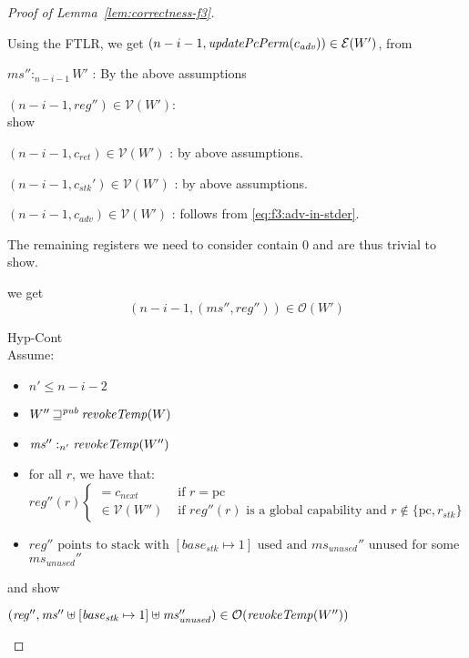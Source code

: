 \documentclass[a4paper]{article}
\newcommand{\var}[1]{\mathit{#1}}
\newcommand{\hs}{\var{ms}}
\newcommand{\ms}{\hs}
\newcommand{\pcreg}{\mathrm{pc}}
\newcommand{\start}{\var{base}}
\newcommand{\reg}{\var{reg}}
\newcommand{\heap}{\var{mem}}
\newcommand{\adv}{\var{adv}}
\newcommand{\stk}{\var{stk}}
\newcommand{\plainfun}[2]{
  \ifthenelse{\equal{#2}{}}
  {\mathit{#1}}
  {\mathit{#1}(#2)}
}
\newcommand{\updatePcPerm}[1]{\plainfun{updatePcPerm}{#1}}
\newcommand{\revokeTemp}[1]{\plainfun{revokeTemp}{#1}}
\newcommand{\futurewk}{\mathbin{\sqsupseteq}^{\var{pub}}}
\newcommand{\heapSat}[3][\heap]{#1 :_{#2} #3}
\newcommand{\memSat}[3][n]{\heapSat[#2]{#1}{#3}}
\newcommand{\asmType}{\plaindom{AsmType}}
\newcommand{\plaindom}[1]{\mathrm{#1}}
\newcommand{\intr}[2]{\mathcal{#1}}
\newcommand{\valueintr}[1]{\intr{V}{#1}}
\newcommand{\exprintr}[1]{\intr{E}{#1}}
\newcommand{\stdvr}{\valueintr{\asmType}}
\newcommand{\stder}{\exprintr{\asmType}}
\newcommand{\observations}{\mathcal{O}}
\newcommand{\npair}[2][n]{\left(#1,#2 \right)}
\begin{document}
\begin{proof}[Proof of Lemma~\ref{lem:correctness-f3}]
\begin{enumproof}
    Using the FTLR, we get $\npair[n-i-1]{\updatePcPerm{c_\adv}} \in \stder(W')$, from
    \begin{enumproof}
      \item $\memSat[n-i-1]{\ms''}{W'}$ : By the above assumptions
      \item $\npair[n-i-1]{\reg''} \in \stdvr(W')$:\\
        show
        \begin{enumproof}
          \item $\npair[n-i-1]{c_{\mathit{ret}}} \in \stdvr(W')$ : by above assumptions.
          \item $\npair[n-i-1]{c_\stk'} \in \stdvr(W')$ : by above assumptions.
          \item $\npair[n-i-1]{c_\adv} \in \stdvr(W')$ : follows from \ref{eq:f3:adv-in-stder}.
          \item The remaining registers we need to consider contain 0 and are thus trivial to show.
        \end{enumproof}
    \end{enumproof}
    we get
    \[
      \npair[n-i-1]{(\ms'',\reg'')} \in \observations(W')
    \]
  \item Hyp-Cont\\
    Assume:
    \begin{itemize}
    \item $n' \leq n-i-2$
    \item $W'' \futurewk \revokeTemp{W}$
    \item $\memSat[n']{\ms''}{\revokeTemp{W''}}$ 
    \item for all $r$, we have that:
      \begin{equation*}
        \reg''(r)
        \begin{cases}
          = c_{\mathit{next}} &\text{ if } r = \pcreg\\
          \in \stdvr(W'') &\text{ if $\reg''(r)$ is a global capability and } r \not\in \{\pcreg, r_\stk\}
        \end{cases}
      \end{equation*}
    \item $\reg'' \text{ points to stack with $[\start_\stk \mapsto 1]$ used and $\ms_{\mathit{unused}}''$ unused}$ for some $\ms_{\mathit{unused}}''$
    \end{itemize}
    and show
    \begin{enumproof}
    \item $(\reg'',\ms'' \uplus [\start_\stk \mapsto 1] \uplus \ms_{\var{unused}}'') \in \observations(\revokeTemp{W''})$\\

\end{enumproof}
\end{enumproof}
\end{proof}
\end{document}
